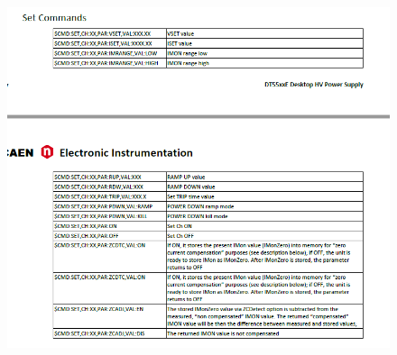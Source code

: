 \documentclass{article}
\begin{document}
\begin{figure}
\centering
\includegraphics[width=0.9\linewidth]{setcommands.png}
\caption{\label{fig:setcommands}}
\end{figure}



%
%
\end{document}
